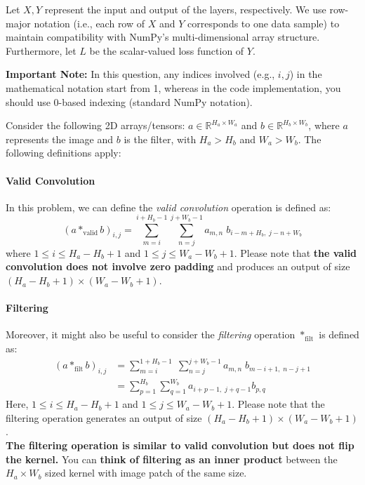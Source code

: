 \documentclass[lang=cn,11pt]{elegantbook}
\begin{document}
Let $X, Y$ represent the input and output of the layers, respectively. We use row-major notation (i.e., each row of $X$ and $Y$ corresponds to one data sample) to maintain compatibility with NumPy's multi-dimensional array structure. Furthermore, let $L$ be the scalar-valued loss function of $Y$.

\textbf{Important Note:} In this question, any indices involved (e.g., $i, j$) in the mathematical notation start from 1, whereas in the code implementation, you should use 0-based indexing (standard NumPy notation).

Consider the following 2D arrays/tensors: $a \in \mathbb{R}^{H_a \times W_a}$ and $b \in \mathbb{R}^{H_b \times W_b}$, where $a$ represents the image and $b$ is the filter, with $H_a > H_b$ and $W_a > W_b$. The following definitions apply:

\paragraph*{Valid Convolution} In this problem, we can define the \textit{valid convolution} operation is defined as:
\[
(a *_{\text{valid}} b)_{i,j} =
\sum_{m=i}^{i+H_b-1} \sum_{n=j}^{j+W_b-1} a_{m,n}\; b_{i-m+H_b,\; j-n+W_b}
\]
where $1 \leq i \leq H_a - H_b + 1$ and $1 \leq j \leq W_a - W_b + 1$. Please note that \textbf{the valid convolution does not involve zero padding} and produces an output of size $(H_a - H_b + 1) \times (W_a - W_b + 1)$.

\paragraph*{Filtering} Moreover, it might also be useful to consider the \textit{filtering} operation $*_{\text{filt}}$ is defined as:
\begin{align}
    (a *_{\text{filt}} b)_{i,j} 
  &  = \sum_{m=i}^{1+H_b - 1} \; \sum_{n=j}^{j+W_b-1}   a_{m,n} \; b_{m-i+1,\; n - j +1} \\
  & =\sum_{p=1}^{H_b} \sum_{q=1}^{W_b} a_{i+p-1,\; j+q-1} b_{p,q}
\end{align}
Here, $1 \leq i \leq H_a - H_b + 1$ and $1 \leq j \leq W_a - W_b + 1$. Please note that the filtering operation generates an output of size $(H_a - H_b + 1) \times (W_a - W_b + 1)$. \\
\textbf{The filtering operation is similar to valid convolution but does not flip the kernel.} You can \textbf{think of filtering as an inner product }between the $H_a \times W_b$ sized kernel with image patch of the same size.
\end{document}
